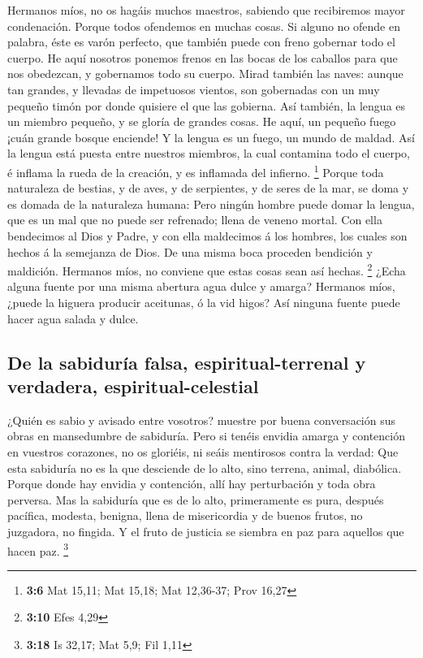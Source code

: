  Hermanos míos, no os hagáis muchos maestros, sabiendo que
recibiremos mayor condenación.  Porque todos ofendemos en
muchas cosas. Si alguno no ofende en palabra, éste es varón perfecto,
que también puede con freno gobernar todo el cuerpo.  He
aquí nosotros ponemos frenos en las bocas de los caballos para que nos
obedezcan, y gobernamos todo su cuerpo.  Mirad también las
naves: aunque tan grandes, y llevadas de impetuosos vientos, son
gobernadas con un muy pequeño timón por donde quisiere el que las
gobierna.  Así también, la lengua es un miembro pequeño, y
se gloría de grandes cosas. He aquí, un pequeño fuego ¡cuán grande
bosque enciende!  Y la lengua es un fuego, un mundo de
maldad. Así la lengua está puesta entre nuestros miembros, la cual
contamina todo el cuerpo, é inflama la rueda de la creación, y es
inflamada del infierno. \footnote{\textbf{3:6} Mat 15,11; Mat 15,18; Mat
  12,36-37; Prov 16,27}  Porque toda naturaleza de
bestias, y de aves, y de serpientes, y de seres de la mar, se doma y es
domada de la naturaleza humana:  Pero ningún hombre puede
domar la lengua, que es un mal que no puede ser refrenado; llena de
veneno mortal.  Con ella bendecimos al Dios y Padre, y con
ella maldecimos á los hombres, los cuales son hechos á la semejanza de
Dios.  De una misma boca proceden bendición y maldición.
Hermanos míos, no conviene que estas cosas sean así hechas. \footnote{\textbf{3:10}
  Efes 4,29}  ¿Echa alguna fuente por una misma abertura
agua dulce y amarga?  Hermanos míos, ¿puede la higuera
producir aceitunas, ó la vid higos? Así ninguna fuente puede hacer agua
salada y dulce.

\hypertarget{de-la-sabiduruxeda-falsa-espiritual-terrenal-y-verdadera-espiritual-celestial}{%
\subsection{De la sabiduría falsa, espiritual-terrenal y verdadera,
espiritual-celestial}\label{de-la-sabiduruxeda-falsa-espiritual-terrenal-y-verdadera-espiritual-celestial}}

 ¿Quién es sabio y avisado entre vosotros? muestre por
buena conversación sus obras en mansedumbre de sabiduría.
 Pero si tenéis envidia amarga y contención en vuestros
corazones, no os gloriéis, ni seáis mentirosos contra la verdad:
 Que esta sabiduría no es la que desciende de lo alto,
sino terrena, animal, diabólica.  Porque donde hay
envidia y contención, allí hay perturbación y toda obra perversa.
 Mas la sabiduría que es de lo alto, primeramente es
pura, después pacífica, modesta, benigna, llena de misericordia y de
buenos frutos, no juzgadora, no fingida.  Y el fruto de
justicia se siembra en paz para aquellos que hacen paz. \footnote{\textbf{3:18}
  Is 32,17; Mat 5,9; Fil 1,11}

